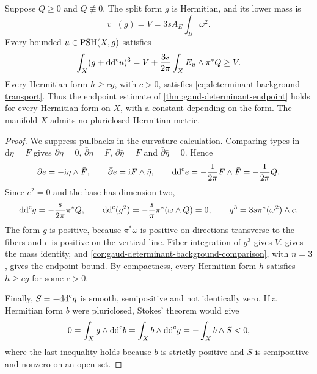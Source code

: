\begin{theorem}\label{thm:elliptic-curvature-endpoint}
Suppose $Q\geq0$ and $Q\not\equiv0$. The split form $g$ is Hermitian, and its lower mass is
\begin{equation}\label{eq:elliptic-curvature-lower-mass}
 v_-(g)=V=3sA_E\int_B\omega^2.
\end{equation}
Every bounded $u\in\mathrm{PSH}(X,g)$ satisfies
\[
 \int_X(g+\mathrm{dd}^{\mathrm{c}} u)^3
 =V+\frac{3s}{2\pi}\int_XE_u\wedge\pi^*Q\geq V.
\]
Every Hermitian form $h\geq c g$, with $c>0$, satisfies \eqref{eq:determinant-background-transport}. Thus the endpoint estimate of \cref{thm:gaud-determinant-endpoint} holds for every Hermitian form on $X$, with a constant depending on the form. The manifold $X$ admits no pluriclosed Hermitian metric.
\end{theorem}
\begin{proof}
We suppress pullbacks in the curvature calculation. Comparing types in $\mathrm d\eta=F$ gives $\partial\eta=0$, $\bar\partial\eta=F$, $\partial\bar\eta=\bar F$ and $\bar\partial\bar\eta=0$. Hence
\[
 \partial e=-\mathrm i\eta\wedge\bar F,\qquad
 \bar\partial e=\mathrm iF\wedge\bar\eta,
 \qquad\mathrm{dd}^{\mathrm{c}} e=-\frac1{2\pi}F\wedge\bar F=-\frac1{2\pi}Q.
\]
Since $e^2=0$ and the base has dimension two,
\[
 \mathrm{dd}^{\mathrm{c}} g=-\frac{s}{2\pi}\pi^*Q,\qquad
 \mathrm{dd}^{\mathrm{c}}(g^2)=-\frac{s}{\pi}\pi^*(\omega\wedge Q)=0,
 \qquad g^3=3s\pi^*(\omega^2)\wedge e.
\]
The form $g$ is positive, because $\pi^*\omega$ is positive on directions transverse to the fibers and $e$ is positive on the vertical line. Fiber integration of $g^3$ gives $V$.  gives the mass identity, and \cref{cor:gaud-determinant-background-comparison}, with $n=3$, gives the endpoint bound. By compactness, every Hermitian form $h$ satisfies $h\geq cg$ for some $c>0$.

Finally, $S=-\mathrm{dd}^{\mathrm{c}} g$ is smooth, semipositive and not identically zero. If a Hermitian form $b$ were pluriclosed, Stokes' theorem would give
\[
 0=\int_Xg\wedge\mathrm{dd}^{\mathrm{c}} b
   =\int_Xb\wedge\mathrm{dd}^{\mathrm{c}} g=-\int_Xb\wedge S<0,
\]
where the last inequality holds because $b$ is strictly positive and $S$ is semipositive and nonzero on an open set.
\end{proof}

